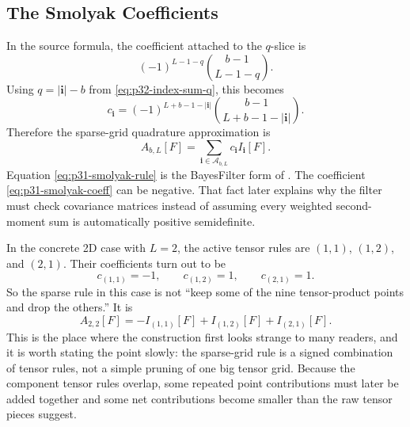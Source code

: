 \documentclass[11pt]{article}
\numberwithin{equation}{section}
\begin{document}
\subsection{The Smolyak Coefficients}
\label{subsec:p32-smolyak-coefficients}

In the source formula, the coefficient attached to the \(q\)-slice is
\[
  (-1)^{L-1-q}\binom{b-1}{L-1-q}.
\]
Using \(q=|\mathbf i|-b\) from \eqref{eq:p32-index-sum-q}, this becomes
\begin{equation}
  c_{\mathbf i}
  =
  (-1)^{L+b-1-|\mathbf i|}
  \binom{b-1}{L+b-1-|\mathbf i|}.
  \label{eq:p31-smolyak-coeff}
\end{equation}
Therefore the sparse-grid quadrature approximation is
\begin{equation}
  A_{b,L}[F]
  =
  \sum_{\mathbf i\in\mathcal A_{b,L}}
  c_{\mathbf i}I_{\mathbf i}[F].
  \label{eq:p31-smolyak-rule}
\end{equation}
Equation \eqref{eq:p31-smolyak-rule} is the BayesFilter form of
\citet[Eq. 26--29]{jia2012sparsegrid}.  The coefficient
\eqref{eq:p31-smolyak-coeff} can be negative.  That fact later explains why
the filter must check covariance matrices instead of assuming every weighted
second-moment sum is automatically positive semidefinite.

In the concrete 2D case with \(L=2\), the active tensor rules are
\((1,1)\), \((1,2)\), and \((2,1)\).  Their coefficients turn out to be
\begin{equation}
  c_{(1,1)}=-1,
  \qquad
  c_{(1,2)}=1,
  \qquad
  c_{(2,1)}=1.
  \label{eq:p36-2d-smolyak-coeffs}
\end{equation}
So the sparse rule in this case is not ``keep some of the nine tensor-product
points and drop the others.''  It is
\begin{equation}
  A_{2,2}[F] = -I_{(1,1)}[F] + I_{(1,2)}[F] + I_{(2,1)}[F].
  \label{eq:p36-2d-smolyak-rule}
\end{equation}
This is the place where the construction first looks strange to many readers,
and it is worth stating the point slowly: the sparse-grid rule is a signed
combination of tensor rules, not a simple pruning of one big tensor grid.
Because the component tensor rules overlap, some repeated point contributions
must later be added together and some net contributions become smaller than the
raw tensor pieces suggest.
\end{document}
